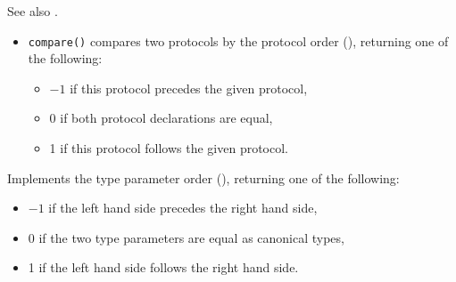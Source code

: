 \documentclass[../generics]{subfiles}
\begin{document}
See also .
\begin{itemize}
\item \texttt{compare()} compares two protocols by the protocol order (), returning one of the following:
\begin{itemize}
\item $-1$ if this protocol precedes the given protocol,
\item 0 if both protocol declarations are equal,
\item 1 if this protocol follows the given protocol.
\end{itemize}
\end{itemize}

Implements the type parameter order (), returning one of the following:
\begin{itemize}
\item $-1$ if the left hand side precedes the right hand side,
\item 0 if the two type parameters are equal as canonical types,
\item 1 if the left hand side follows the right hand side.
\end{itemize}
\end{document}
